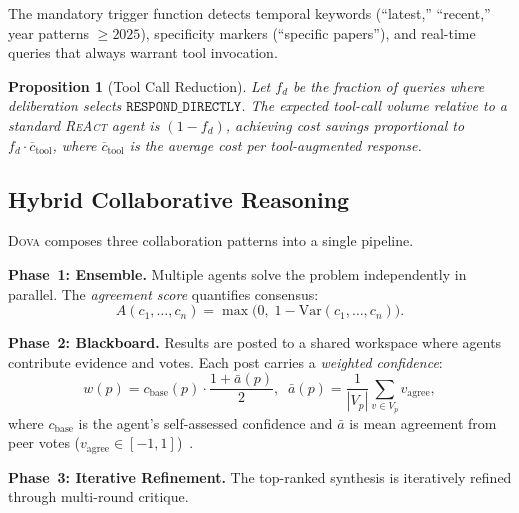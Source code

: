 \documentclass{article}
\theoremstyle{plain}
\newtheorem{proposition}[theorem]{Proposition}
\theoremstyle{definition}
\newcommand{\dova}{\textsc{Dova}}
\newcommand{\react}{\textsc{ReAct}}
\begin{document}
The mandatory trigger function detects temporal keywords (``latest,''
``recent,'' year patterns ${\geq}2025$), specificity markers (``specific
papers''), and real-time queries that always warrant tool invocation.

\begin{proposition}[Tool Call Reduction]\label{prop:toolcall}
Let $f_d$ be the fraction of queries where deliberation selects
$\texttt{RESPOND\_DIRECTLY}$.  The expected tool-call volume relative to a
standard \react{} agent is $(1 - f_d)$, achieving cost savings proportional
to $f_d \cdot \overline{c}_{\mathrm{tool}}$, where
$\overline{c}_{\mathrm{tool}}$ is the average cost per tool-augmented response.
\end{proposition}

\subsection{Hybrid Collaborative Reasoning}\label{sec:hybrid}

\dova{} composes three collaboration patterns into a single pipeline.

\textbf{Phase~1: Ensemble.}\quad
Multiple agents solve the problem independently in parallel.  The
\emph{agreement score} quantifies consensus:
\begin{equation}\label{eq:agreement}
  A(c_1, \ldots, c_n) = \max\!\bigl(0,\; 1 - \mathrm{Var}(c_1, \ldots, c_n)\bigr).
\end{equation}

\textbf{Phase~2: Blackboard.}\quad
Results are posted to a shared workspace where agents contribute evidence and
votes.  Each post carries a \emph{weighted confidence}:
\begin{equation}\label{eq:blackboard}
  w(p) = c_\mathrm{base}(p) \cdot \frac{1 + \bar{a}(p)}{2},
  \;\;
  \bar{a}(p) = \frac{1}{|V_p|}\!\sum_{v \in V_p}\! v_\mathrm{agree},
\end{equation}
where $c_\mathrm{base}$ is the agent's self-assessed confidence and $\bar{a}$
is mean agreement from peer votes
($v_\mathrm{agree} \in [-1, 1]$)~\citep{hayesroth1985blackboard}.

\textbf{Phase~3: Iterative Refinement.}\quad
The top-ranked synthesis is iteratively refined through multi-round critique.
\end{document}
